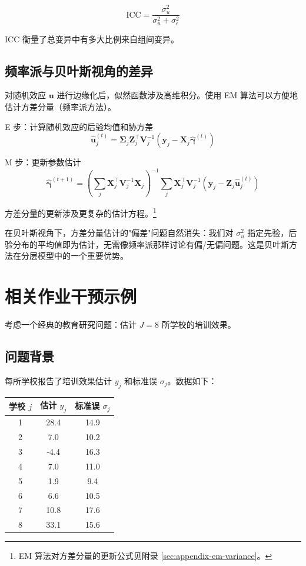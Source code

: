 \[
\mathrm{ICC} = \frac{\sigma_u^2}{\sigma_u^2 + \sigma_\epsilon^2}
\]

ICC 衡量了总变异中有多大比例来自组间变异。

\subsection{频率派与贝叶斯视角的差异}
\label{sec:frequentist-bayesian-variance}

对随机效应 $\mathbf{u}$ 进行边缘化后，似然函数涉及高维积分。使用 EM 算法可以方便地估计方差分量（频率派方法）。

E 步：计算随机效应的后验均值和协方差
\[
\widehat{\mathbf{u}}_j^{(t)} = \boldsymbol{\Sigma}_j \mathbf{Z}_j^\top \mathbf{V}_j^{-1} (\mathbf{y}_j - \mathbf{X}_j \widehat{\boldsymbol{\gamma}}^{(t)})
\]

M 步：更新参数估计
\[
\widehat{\boldsymbol{\gamma}}^{(t+1)} = \left(\sum_j \mathbf{X}_j^\top \mathbf{V}_j^{-1} \mathbf{X}_j \right)^{-1} \sum_j \mathbf{X}_j^\top \mathbf{V}_j^{-1} (\mathbf{y}_j - \mathbf{Z}_j \widehat{\mathbf{u}}_j^{(t)})
\]

方差分量的更新涉及更复杂的估计方程。\footnote{EM 算法对方差分量的更新公式见附录 \cref{sec:appendix-em-variance}。}

\begin{Remark}
在贝叶斯视角下，方差分量估计的"偏差"问题自然消失：我们对 $\sigma_u^2$ 指定先验，后验分布的平均值即为估计，无需像频率派那样讨论有偏/无偏问题。这是贝叶斯方法在分层模型中的一个重要优势。
\end{Remark}

\section{相关作业干预示例}
\label{sec:example-coaching}

考虑一个经典的教育研究问题：估计 $J = 8$ 所学校的培训效果。

\subsection{问题背景}
\label{sec:coaching-background}

每所学校报告了培训效果估计 $y_j$ 和标准误 $\sigma_j$。数据如下：

\begin{center}
\begin{tabular}{ccc}
\hline
学校 $j$ & 估计 $y_j$ & 标准误 $\sigma_j$ \\
\hline
1 & 28.4 & 14.9 \\
2 & 7.0 & 10.2 \\
3 & -4.4 & 16.3 \\
4 & 7.0 & 11.0 \\
5 & 1.9 & 9.4 \\
6 & 6.6 & 10.5 \\
7 & 10.8 & 17.6 \\
8 & 33.1 & 15.6 \\
\hline
\end{tabular}
\end{center}

